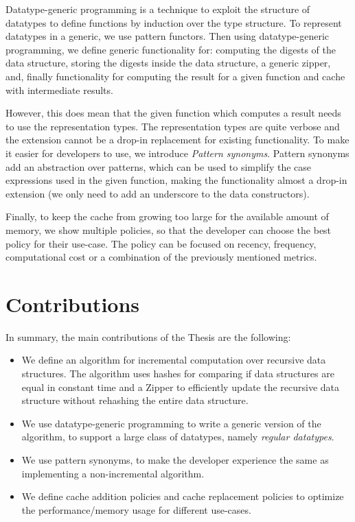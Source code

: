 Datatype-generic programming is a technique to exploit the structure of datatypes to define functions by induction over the type structure. To represent datatypes in a generic, we use pattern functors. Then using datatype-generic programming, we define generic functionality for: computing the digests of the data structure, storing the digests inside the data structure, a generic zipper, and, finally functionality for computing the result for a given function and cache with intermediate results. 

However, this does mean that the given function which computes a result needs to use the representation types. The representation types are quite verbose and the extension cannot be a drop-in replacement for existing functionality. To make it easier for developers to use, we introduce \textit{Pattern synonyms}\cite*{pickering2016pattern}. Pattern synonyms add an abstraction over patterns, which can be used to simplify the case expressions used in the given function, making the functionality almost a drop-in extension (we only need to add an underscore to the data constructors). 



Finally, to keep the cache from growing too large for the available amount of memory, we show multiple policies, so that the developer can choose the best policy for their use-case. The policy can be focused on recency, frequency, computational cost or a combination of the previously mentioned metrics.

\newpage
\section{Contributions}

In summary, the main contributions of the Thesis are the following:

\begin{itemize}
    \item We define an algorithm for incremental computation over recursive data structures. The algorithm uses hashes for comparing if data structures are equal in constant time and a Zipper to efficiently update the recursive data structure without rehashing the entire data structure.
    \item We use datatype-generic programming to write a generic version of the algorithm, to support a large class of datatypes, namely \textit{regular datatypes}.
    \item We use pattern synonyms, to make the developer experience the same as implementing a non-incremental algorithm.
    \item We define cache addition policies and cache replacement policies to optimize the performance/memory usage for different use-cases.
\end{itemize}


